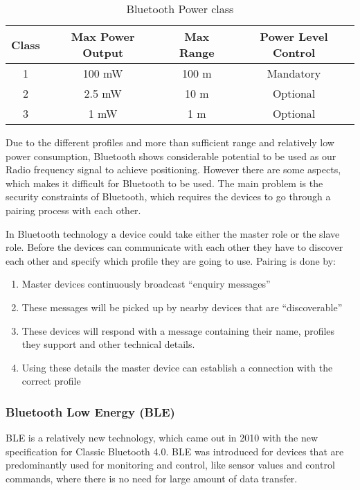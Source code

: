 \begin{table}[H]
\centering
\begin{tabular}{|c|c|c|c|}
\hline 
Class & Max Power Output & Max Range & Power Level Control\tabularnewline
\hline 
\hline 
1 & 100 mW & 100 m  & Mandatory\tabularnewline
\hline 
2 & 2.5 mW & 10 m & Optional\tabularnewline
\hline 
3 & 1 mW & 1 m & Optional\tabularnewline
\hline 
\end{tabular}

\protect\caption{Bluetooth Power class}
\end{table}


Due to the different profiles and more than sufficient range and relatively
low power consumption, Bluetooth shows considerable potential to be
used as our Radio frequency signal to achieve positioning. However there are
some aspects, which makes it difficult for Bluetooth to be used.
The main problem is the security constraints of Bluetooth, which requires
the devices to go through a pairing process with each other. 

In Bluetooth technology a device could take either the master role
or the slave role. Before the devices can communicate with each other
they have to discover each other and specify which profile they are
going to use. Pairing is done by: 
\begin{enumerate}
\item Master devices continuously broadcast \textquotedblleft enquiry messages\textquotedblright{}
\item These messages will be picked up by nearby devices that are \textquotedblleft discoverable\textquotedblright{} 
\item These devices will respond with a message containing their name, profiles
they support and other technical details. 
\item Using these details the master device can establish a connection with
the correct profile 
\end{enumerate}

\subsubsection{Bluetooth Low Energy (BLE)}

BLE is a relatively new technology, which came out in 2010 with the
new specification for Classic Bluetooth 4.0\cite{ble-wiki}. BLE was introduced for
devices that are predominantly used for monitoring and control, like
sensor values and control commands, where there is no need for large
amount of data transfer.


